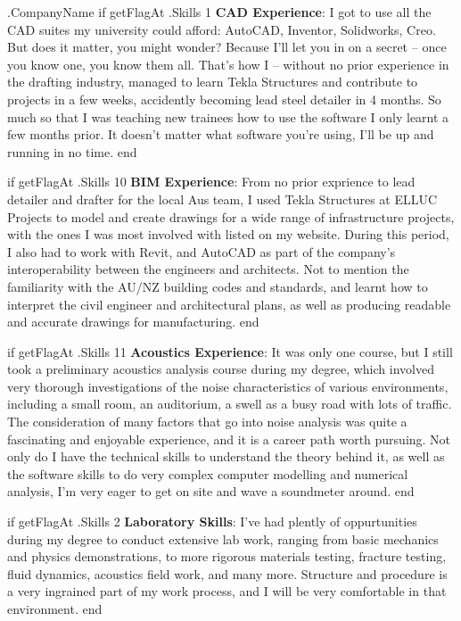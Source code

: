 \documentclass[10pt]{letter}
\begin{document}
\begin{letter}{
    {{ .CompanyName }}
}
{{ if getFlagAt .Skills 1 }}
\textbf{CAD Experience}: I got to use all the CAD suites my university could afford: AutoCAD, Inventor, Solidworks, Creo. But does it matter, you might wonder? Because I'll let you in on a secret -- once you know one, you know them all. That's how I -- without no prior experience in the drafting industry, managed to learn Tekla Structures and contribute to projects in a few weeks, accidently becoming lead steel detailer in 4 months. So much so that I was teaching new trainees how to use the software I only learnt a few months prior. It doesn't matter what software you're using, I'll be up and running in no time. 
{{ end }}

{{ if getFlagAt .Skills 10 }}
\textbf{BIM Experience}: From no prior exprience to lead detailer and drafter for the local Aus team, I used Tekla Structures at ELLUC Projects to model and create drawings for a wide range of infrastructure projects, with the ones I was most involved with listed on my website. During this period, I also had to work with Revit, and AutoCAD as part of the company's interoperability between the engineers and architects. Not to mention the familiarity with the AU/NZ building codes and standards, and learnt how to interpret the civil engineer and architectural plans, as well as producing readable and accurate drawings for manufacturing. 
{{ end }}

{{ if getFlagAt .Skills 11 }}
\textbf{Acoustics Experience}: It was only one course, but I still took a preliminary acoustics analysis course during my degree, which involved very thorough investigations of the noise characteristics of various environments, including a small room, an auditorium, a swell as a busy road with lots of traffic. The consideration of many factors that go into noise analysis was quite a fascinating and enjoyable experience, and it is a career path worth pursuing. Not only do I have the technical skills to understand the theory behind it, as well as the software skills to do very complex computer modelling and numerical analysis, I'm very eager to get on site and wave a soundmeter around. 
{{ end }}

{{ if getFlagAt .Skills 2 }}
\textbf{Laboratory Skills}: I've had plently of oppurtunities during my degree to conduct extensive lab work, ranging from basic mechanics and physics demonstrations, to more rigorous materials testing, fracture testing, fluid dynamics, acoustics field work, and many more. Structure and procedure is a very ingrained part of my work process, and I will be very comfortable in that environment. 
{{ end }}


\end{letter}
\end{document}
